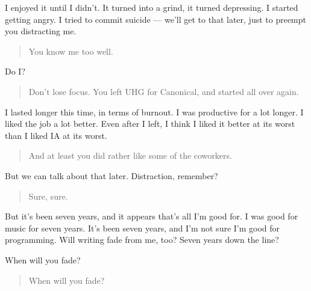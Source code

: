 I enjoyed it until I didn't. It turned into a grind, it turned depressing. I started getting angry. I tried to commit suicide --- we'll get to that later, just to preempt you distracting me.

\begin{quote}
You know me too well.
\end{quote}

Do I?

\begin{quote}
Don't lose focus. You left UHG for Canonical, and started all over again.
\end{quote}

I lasted longer this time, in terms of burnout. I was productive for a lot longer. I liked the job a lot better. Even after I left, I think I liked it better at its worst than I liked IA at its worst.

\begin{quote}
And at least you did rather like some of the coworkers.
\end{quote}

But we can talk about that later. Distraction, remember?

\begin{quote}
Sure, sure.
\end{quote}

But it's been seven years, and it appears that's all I'm good for. I was good for music for seven years. It's been seven years, and I'm not sure I'm good for programming. Will writing fade from me, too? Seven years down the line?

When will you fade?

\begin{quote}
When will you fade?
\end{quote}
